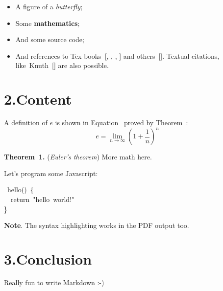\documentclass[10pt]{book}
\begin{document}
\begin{itemize}[noitemsep,topsep=\mdcompacttopsep]%

\item A figure of a \emph{butterfly};%

\item Some \textbf{mathematics};%

\item And some source code;%

\item And references to Tex books~[, , , ] and others~[]. 
Textual citations, like~Knuth~[] are also possible.%
\end{itemize}%

\section{2.\hspace*{0.5em}Content}\label{sec-content}%

\noindent A definition of $e$ is shown in Equation~ proved by Theorem~:%
\label{euler}%
\noindent{}
\noindent\[e = \lim_{n\to\infty} \left( 1 + \frac{1}{n} \right)^n
\]%

\begin{mdbmarginx}{1ex}{0pt}{1ex}{0pt}%
\noindent\textbf{Theorem~1.} ({\itshape Euler's theorem})\mdbr
More math here.%
\label{th-euler}%
\end{mdbmarginx}%

\noindent Let's program some Javascript:%
\begin{mdpre}%
~hello()~\{\\
~~{return}~{"}{hello~world!}{"}\\
\}%
\end{mdpre}
\noindent\textbf{Note}.
The syntax highlighting works in the PDF output too.%

\section{3.\hspace*{0.5em}Conclusion}\label{sec-conclusion}%

\noindent Really fun to write Markdown :-)%
\end{document}
